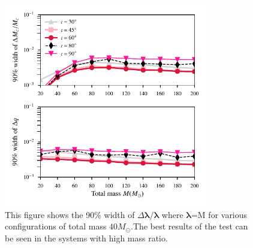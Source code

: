 \documentclass[prl,preprintnumbers,twocolumn,eqsecnum,floatfix,a4paper,nofootinbib,superscriptaddress]{revtex4}
\newcommand{\blambda}{\bm{\lambda}}
\begin{document}
\begin{figure}[h]
	\includegraphics*[width=3.5in]{figs/fig3b.pdf}
	\caption{This figure shows the 90$\%$ width of $\Delta \blambda/\blambda$ where $\blambda$=M for various configurations of total mass $40M_{\odot}$.The best results of the test can be seen in the systems with high mass ratio.}
	\label{fig:dMc_dq_posteriors_gr}
\end{figure}
\end{document}
